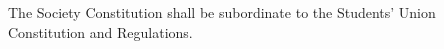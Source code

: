 \begin{clause}
  The Society Constitution shall be subordinate to the Students' Union Constitution and Regulations.
\end{clause}